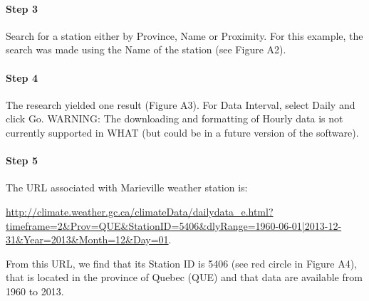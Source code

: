 \documentclass[WHATMANUAL.tex]{subfiles}
\begin{document}
\paragraph{Step 3} Search for a station either by Province, Name or Proximity. For this example, the search was made using the Name of the station (see Figure A2).

\paragraph{Step 4} The research yielded one result (Figure A3). For Data Interval, select Daily and click Go.
	WARNING: The downloading and formatting of Hourly data is not currently supported in WHAT (but could be in a future version of the software).

\paragraph{Step 5} The URL associated with Marieville weather station is:\vspace{0.5cm}

\begin{sloppypar}
\noindent
\url{http://climate.weather.gc.ca/climateData/dailydata_e.html?timeframe=2&Prov=QUE&StationID=5406&dlyRange=1960-06-01|2013-12-31&Year=2013&Month=12&Day=01}.
\end{sloppypar}\vspace{0.5cm}

From this URL, we find that its Station ID is 5406 (see red circle in Figure A4), that is located in the province of Quebec (QUE) and that data are available from 1960 to 2013.
\end{document}

